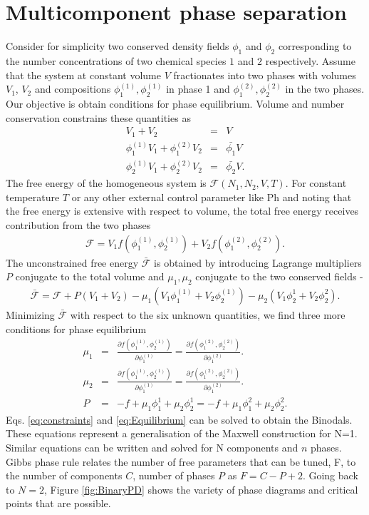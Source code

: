 \section{Multicomponent phase separation}
Consider for simplicity two conserved density fields $\phi_1$ and $\phi_2$ corresponding to the number concentrations of two chemical species $1$ and $2$ respectively. Assume that the system at constant volume $V$ fractionates into two phases with volumes $V_1$, $V_2$ and compositions $\phi_1^{(1)}, \phi_2^{(1)}$ in phase 1 and $\phi_1^{(2)},\phi_2^{(2)}$ in the two phases. Our objective is obtain conditions for phase equilibrium. Volume and number conservation constrains these quantities as 
\begin{eqnarray}
    V_1 +V_2 &=& V  \\
     \phi_1^{(1)} V_1 + \phi_1^{(2)} V_2 &=&  \bar{\phi_1} V \\
     \phi_2^{(1)} V_1 + \phi_2^{(2)} V_2 &=&  \bar{\phi_2} V.
     \label{eq:constraints}
\end{eqnarray}
The free energy of the homogeneous system is $\mathcal{F}(N_1,N_2,V,T)$. For constant temperature $T$ or any other external control parameter like Ph and noting that the free energy is extensive with respect to volume, the total free energy receives contribution from the two phases 
\begin{eqnarray}
\mathcal{F} = V_1 f(\phi_1^{(1)},\phi_2^{(1)}) + V_2 f(\phi_1^{(2)},\phi_2^{(2)}).
\label{eq:TotalFreeEnergy}
\end{eqnarray}
The unconstrained free energy $\bar{\mathcal{F}}$ is obtained by introducing Lagrange multipliers $P$ conjugate to the total volume and $\mu_1,\mu_2$ conjugate to the two conserved fields - 
\begin{eqnarray}
\bar{\mathcal{F}} = \mathcal{F} +P(V_1 + V_2) - \mu_1 (V_1 \phi_1^{(1)} + V_2 \phi_2^{(1)}) - \mu_2 (V_1 \phi_2^1 + V_2 \phi_2^2).
\end{eqnarray}
Minimizing $\bar{\mathcal{F}}$ with respect to the six unknown quantities, we find three more conditions for phase equilibrium
\begin{eqnarray}
\mu_1 &=& \frac{\partial f(\phi_1^{(1)},\phi_2^{(1)})}{\partial \phi_1^{(1)}} = \frac{\partial f(\phi_1^{(2)},\phi_2^{(2)})}{\partial \phi_1^{(2)}}. \\
\mu_2 &=& \frac{\partial f(\phi_1^{(1)},\phi_2^{(1)})}{\partial \phi_1^{(1)}} = \frac{\partial f(\phi_1^{(2)},\phi_2^{(2)})}{\partial \phi_1^{(2)}}. \\
P &=& -f + \mu_1 \phi_1^1 + \mu_2 \phi_2^1  = -f + \mu_1 \phi_1^2 + \mu_2 \phi_2^2. 
\label{eq:Equilibrium}
\end{eqnarray}
Eqs. \eqref{eq:constraints} and \eqref{eq:Equilibrium} can be solved to obtain the Binodals. These equations represent a generalisation of the Maxwell construction for N=1. Similar equations can be written and solved for N components and $n$ phases. Gibbs phase rule relates the number of free parameters that can be tuned, F, to the number of components $C$, number of phases $P$ as $F = C-P+2$. Going back to $N=2$, Figure \ref{fig:BinaryPD} shows the variety of phase diagrams and critical points that are possible. 

